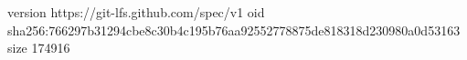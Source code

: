 version https://git-lfs.github.com/spec/v1
oid sha256:766297b31294cbe8c30b4c195b76aa92552778875de818318d230980a0d53163
size 174916
